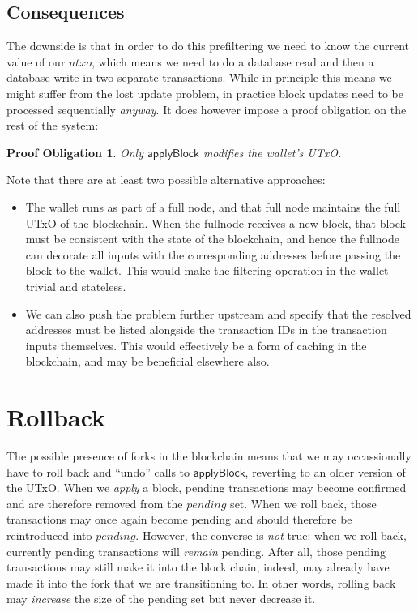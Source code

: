 \documentclass{article}
\newtheorem{proofobligation}{Proof Obligation}
\begin{document}

\subsection{Consequences}

The downside is that in order to do this prefiltering we need to know the
current value of our $utxo$, which means we need to do a database read and then
a database write in two separate transactions. While in principle this means
we might suffer from the lost update problem, in practice block updates need to
be processed sequentially \emph{anyway}. It does however impose a proof
obligation on the rest of the system:

\begin{proofobligation}
Only $\mathsf{applyBlock}$ modifies the wallet's UTxO.
\end{proofobligation}

Note that there are at least two possible alternative approaches:

\begin{itemize}
\item The wallet runs as part of a full node, and that full node maintains
the full UTxO of the blockchain. When the fullnode receives a new block,
that block must be consistent with the state of the blockchain, and hence
the fullnode can decorate all inputs with the corresponding addresses before
passing the block to the wallet. This would make the filtering operation in
the wallet trivial and stateless.
\item We can also push the problem further upstream and specify that the
resolved addresses must be listed alongside the transaction IDs in the
transaction inputs themselves. This would effectively be a form of caching
in the blockchain, and may be beneficial elsewhere also.
\end{itemize}

\section{Rollback}
\label{sec:rollback}

The possible presence of forks in the blockchain means that we may occassionally
have to roll back and ``undo'' calls to $\mathsf{applyBlock}$, reverting to an
older version of the UTxO. When we \emph{apply} a block, pending transactions
may become confirmed and are therefore removed from the $\mathit{pending}$ set.
When we roll back, those transactions may once again become pending and should
therefore be reintroduced into $\mathit{pending}$. However, the converse is
\emph{not} true: when we roll back, currently pending transactions will
\emph{remain} pending. After all, those pending transactions may still make it
into the block chain; indeed, may already have made it into the fork that we are
transitioning to. In other words, rolling back may \emph{increase} the size of
the pending set but never decrease it.
\end{document}
